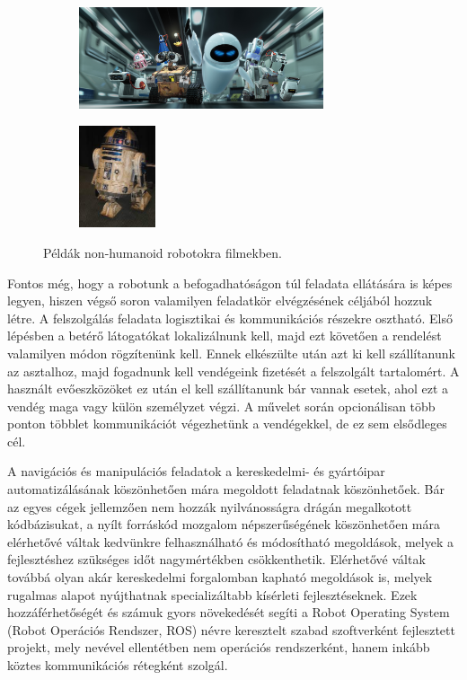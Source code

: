 \begin{figure}
    \centering
    \begin{subfigure}[b]{0.45\linewidth}
        \includegraphics[height=3cm]{figures/non_humanoid_robots/wall_e.jpg}
    \end{subfigure}
    \begin{subfigure}[b]{0.15\linewidth}
        \includegraphics[height=3cm]{figures/non_humanoid_robots/r2d2.jpg}
    \end{subfigure}
    \caption{Példák non-humanoid robotokra filmekben.}
    \label{fig:neural_network_article_numbers}
\end{figure}

Fontos még, hogy a robotunk a befogadhatóságon túl feladata ellátására is képes legyen, hiszen végső soron valamilyen feladatkör elvégzésének céljából hozzuk létre. A felszolgálás feladata logisztikai és kommunikációs részekre osztható. Első lépésben a betérő látogatókat lokalizálnunk kell, majd ezt követően a rendelést valamilyen módon rögzítenünk kell. Ennek elkészülte után azt ki kell szállítanunk az asztalhoz, majd fogadnunk kell vendégeink fizetését a felszolgált tartalomért. A használt evőeszközöket ez után el kell szállítanunk bár vannak esetek, ahol ezt a vendég maga vagy külön személyzet végzi. A művelet során opcionálisan több ponton többlet kommunikációt végezhetünk a vendégekkel, de ez sem elsődleges cél. 

A navigációs és manipulációs feladatok a kereskedelmi- és gyártóipar automatizálásának köszönhetően mára megoldott feladatnak köszönhetőek. Bár az egyes cégek jellemzően nem hozzák nyilvánosságra drágán megalkotott kódbázisukat, a nyílt forráskód mozgalom népszerűségének köszönhetően mára elérhetővé váltak kedvünkre felhasználható és módosítható megoldások, melyek a fejlesztéshez szükséges időt nagymértékben csökkenthetik. Elérhetővé váltak továbbá olyan akár kereskedelmi forgalomban kapható megoldások is, melyek rugalmas alapot nyújthatnak specializáltabb kísérleti fejlesztéseknek. Ezek hozzáférhetőségét és számuk gyors növekedését segíti a Robot Operating System (Robot Operációs Rendszer, ROS) névre keresztelt szabad szoftverként fejlesztett projekt, mely nevével ellentétben nem operációs rendszerként, hanem inkább köztes kommunikációs rétegként szolgál. 

